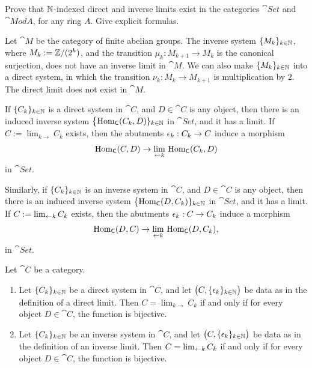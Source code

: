 \begin{exer} \label{exer:3011}
Prove that $\mathbb{N}$-indexed direct and inverse limits exist in the categories 
$\cat{Set}$ and $\cat{Mod} A$, for any ring $A$. Give explicit formulas.
\end{exer}

\begin{exa} \label{ea:1740}
Let $\cat{M}$ be the category of finite abelian groups. 
The inverse system $\{ M_k \}_{k \in \mathbb{N}}$, where
$M_k := \mathbb{Z} / (2^k)$, and the transition 
$\mu_k :  M_{k + 1} \to M_k$ is the canonical surjection, 
does not have an inverse limit in $\cat{M}$. We can also make 
$\{ M_k \}_{k \in \mathbb{N}}$ into a direct system, in which the transition
$\nu_k : M_k \to  M_{k + 1}$ 
is multiplication by $2$. The direct limit does not exist in $\cat{M}$.
\end{exa}

If  $\{ C_k \}_{k \in \mathbb{N}}$ is a direct system in $\cat{C}$, and 
$D \in \cat{C}$ is any object, then there is an induced inverse system 
$\bigl\{ \operatorname{Hom}_{\operatorname{\mathsf{C}}}(C_k, D) \}_{k \in \mathbb{N}}$
in $\cat{Set}$, and it has a limit. If 
$C := \lim_{k \to} C_k$ exists, then the abutments $\epsilon_k : C_k \to C$ induce 
a morphism 
\begin{equation} \label{eqn:3010}
\operatorname{Hom}_{\operatorname{\mathsf{C}}}(C, D) \to 
\lim_{\leftarrow k} \, \operatorname{Hom}_{\operatorname{\mathsf{C}}}(C_k, D) 
\end{equation}
in $\cat{Set}$. 

Similarly, if $\{ C_k \}_{k \in \mathbb{N}}$ is an inverse system in $\cat{C}$, 
and $D \in \cat{C}$ is any object, then there is an induced inverse system 
$\bigl\{ \operatorname{Hom}_{\operatorname{\mathsf{C}}}(D, C_k) \}_{k \in \mathbb{N}}$
in $\cat{Set}$, and it has a limit. If $C := \lim_{\leftarrow k} C_k$ exists,
then the abutments $\epsilon_k : C \to C_k$ induce a morphism 
\begin{equation} \label{eqn:3011}
\operatorname{Hom}_{\operatorname{\mathsf{C}}}(D, C) \to 
\lim_{\leftarrow k} \, \operatorname{Hom}_{\operatorname{\mathsf{C}}}(D, C_k) , 
\end{equation}
in $\cat{Set}$. 


\begin{prop} \label{prop:1535}
Let $\cat{C}$ be a category. 
\begin{enumerate}
\item Let  $\{ C_k \}_{k \in \mathbb{N}}$ be a direct system in $\cat{C}$,
and let $\bigl( C , \{ \epsilon_{k} \}_{k \in \mathbb{N}} \bigr)$ be data as in the 
definition of a direct limit. Then  
$C = \lim_{k \to} C_k$ if and only if for every object 
$D \in \cat{C}$, the function \tup{(\ref{eqn:3010})} is bijective. 

\item Let  $\{ C_k \}_{k \in \mathbb{N}}$ be an inverse system in $\cat{C}$,
and let $\bigl( C , \{ \epsilon_{k} \}_{k \in \mathbb{N}} \bigr)$ be data as in the 
definition of an inverse limit. Then  
$C = \lim_{\leftarrow k} C_k$ if and only if for every object 
$D \in \cat{C}$, the function \tup{(\ref{eqn:3011})} is bijective. 
\end{enumerate}
\end{prop}

